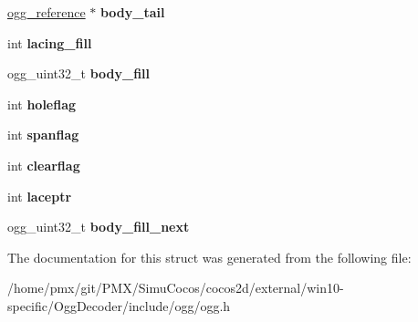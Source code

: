 \begin{DoxyCompactItemize}
\item 
\mbox{\label{structogg__stream__state_a7166f2b7d21037410d21e144223d633e}} 
\hyperlink{structogg__reference}{ogg\+\_\+reference} $\ast$ {\bfseries body\+\_\+tail}
\item 
\mbox{\label{structogg__stream__state_a461e18b05c6426e6d036ef33c4c92f02}} 
int {\bfseries lacing\+\_\+fill}
\item 
\mbox{\label{structogg__stream__state_ac70d82cd6415a1075242d900c6d52b9a}} 
ogg\+\_\+uint32\+\_\+t {\bfseries body\+\_\+fill}
\item 
\mbox{\label{structogg__stream__state_a2e41857bdc66d8a73c6d4e5453bba12b}} 
int {\bfseries holeflag}
\item 
\mbox{\label{structogg__stream__state_a547057757054c864f75d1f2fb6e63f35}} 
int {\bfseries spanflag}
\item 
\mbox{\label{structogg__stream__state_a2959a9d375c2e05a1e3b758705a478b5}} 
int {\bfseries clearflag}
\item 
\mbox{\label{structogg__stream__state_ad4ed347217b6f18ca96fbcc0f37fb7df}} 
int {\bfseries laceptr}
\item 
\mbox{\label{structogg__stream__state_a245ef57bdecb99abae11f020d504a3da}} 
ogg\+\_\+uint32\+\_\+t {\bfseries body\+\_\+fill\+\_\+next}
\end{DoxyCompactItemize}


The documentation for this struct was generated from the following file\+:\begin{DoxyCompactItemize}
\item 
/home/pmx/git/\+P\+M\+X/\+Simu\+Cocos/cocos2d/external/win10-\/specific/\+Ogg\+Decoder/include/ogg/ogg.\+h\end{DoxyCompactItemize}

